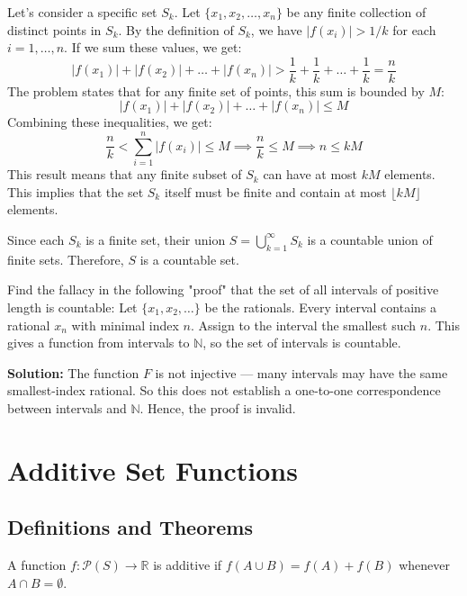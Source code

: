 Let's consider a specific set $S_k$. Let $\{x_1, x_2, \dots, x_n\}$ be any finite collection of distinct points in $S_k$.
By the definition of $S_k$, we have $|f(x_i)| > 1/k$ for each $i=1, \dots, n$.
If we sum these values, we get:
\[ |f(x_1)| + |f(x_2)| + \dots + |f(x_n)| > \frac{1}{k} + \frac{1}{k} + \dots + \frac{1}{k} = \frac{n}{k} \]
The problem states that for any finite set of points, this sum is bounded by $M$:
\[ |f(x_1)| + |f(x_2)| + \dots + |f(x_n)| \le M \]
Combining these inequalities, we get:
\[ \frac{n}{k} < \sum_{i=1}^n |f(x_i)| \le M \implies \frac{n}{k} \le M \implies n \le kM \]
This result means that any finite subset of $S_k$ can have at most $kM$ elements. This implies that the set $S_k$ itself must be finite and contain at most $\lfloor kM \rfloor$ elements.

Since each $S_k$ is a finite set, their union $S = \bigcup_{k=1}^{\infty} S_k$ is a countable union of finite sets. Therefore, $S$ is a countable set.

\begin{problembox}
Find the fallacy in the following "proof" that the set of all intervals of positive length is countable:  
Let \( \{x_1, x_2, \ldots\} \) be the rationals. Every interval contains a rational \( x_n \) with minimal index \( n \).  
Assign to the interval the smallest such \( n \). This gives a function from intervals to \( \mathbb{N} \), so the set of intervals is countable.
\end{problembox}

\textbf{Solution:}  
The function \( F \) is not injective — many intervals may have the same smallest-index rational.  
So this does not establish a one-to-one correspondence between intervals and \( \mathbb{N} \).  
Hence, the proof is invalid.

\section{Additive Set Functions}

\subsection*{Definitions and Theorems}

\begin{definition}
A function $f: \mathcal{P}(S) \to \mathbb{R}$ is additive if $f(A \cup B) = f(A) + f(B)$ whenever $A \cap B = \emptyset$.
\end{definition}

